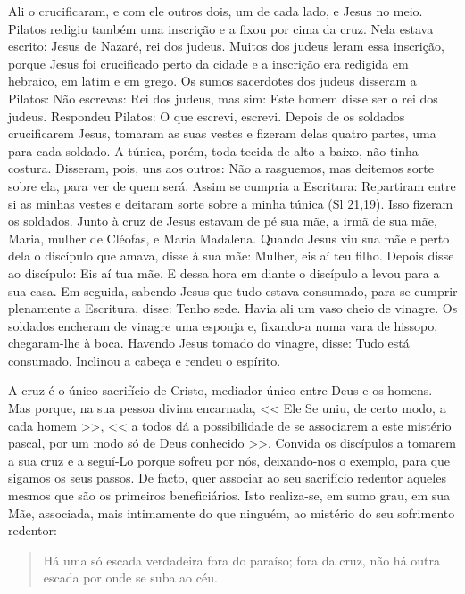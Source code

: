 \documentclass{rosario}
\begin{document}

Ali o crucificaram, e com ele outros dois, um de cada lado, e Jesus no meio.
Pilatos redigiu também uma inscrição e a fixou por cima da cruz.
Nela estava escrito:
Jesus de Nazaré, rei dos judeus.
Muitos dos judeus leram essa inscrição, porque Jesus foi crucificado perto da cidade e a inscrição era redigida em hebraico, em latim e em grego.
Os sumos sacerdotes dos judeus disseram a Pilatos:
Não escrevas:
Rei dos judeus, mas sim:
Este homem disse ser o rei dos judeus.
Respondeu Pilatos:
O que escrevi, escrevi.
Depois de os soldados crucificarem Jesus, tomaram as suas vestes e fizeram delas quatro partes, uma para cada soldado.
A túnica, porém, toda tecida de alto a baixo, não tinha costura.
Disseram, pois, uns aos outros:
Não a rasguemos, mas deitemos sorte sobre ela, para ver de quem será.
Assim se cumpria a Escritura:
Repartiram entre si as minhas vestes e deitaram sorte sobre a minha túnica (Sl 21,19).
Isso fizeram os soldados.
Junto à cruz de Jesus estavam de pé sua mãe, a irmã de sua mãe, Maria, mulher de Cléofas, e Maria Madalena.
Quando Jesus viu sua mãe e perto dela o discípulo que amava, disse à sua mãe:
Mulher, eis aí teu filho.
Depois disse ao discípulo:
Eis aí tua mãe.
E dessa hora em diante o discípulo a levou para a sua casa.
Em seguida, sabendo Jesus que tudo estava consumado, para se cumprir plenamente a Escritura, disse:
Tenho sede.
Havia ali um vaso cheio de vinagre.
Os soldados encheram de vinagre uma esponja e, fixando-a numa vara de hissopo, chegaram-lhe à boca.
Havendo Jesus tomado do vinagre, disse:
Tudo está consumado.
Inclinou a cabeça e rendeu o espírito.


A cruz é o único sacrifício de Cristo, mediador único entre Deus e os homens.
Mas porque, na sua pessoa divina encarnada,
<< Ele Se uniu, de certo modo, a cada homem >>, << a todos dá a possibilidade de se associarem a este mistério pascal, por um modo só de Deus conhecido >>.
Convida os discípulos a tomarem a sua cruz e a seguí-Lo porque sofreu por nós, deixando-nos o exemplo, para que sigamos os seus passos.
De facto, quer associar ao seu sacrifício redentor aqueles mesmos que são os primeiros beneficiários.
Isto realiza-se, em sumo grau, em sua Mãe, associada, mais intimamente do que ninguém, ao mistério do seu sofrimento redentor:
\begin{quote}
Há uma só escada verdadeira fora do paraíso;
fora da cruz, não há outra escada por onde se suba ao céu.
\end{quote}
\end{document}
